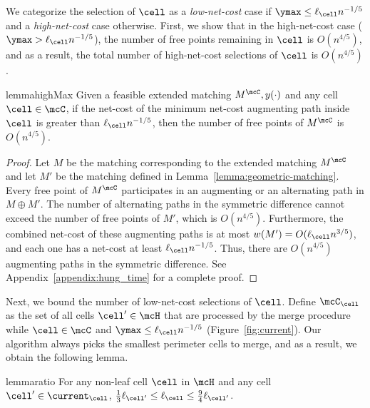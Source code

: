 We categorize the selection of $\cell$ as a \emph{low-net-cost} case if $\ymax\le \ell_\cell n^{-1/5}$ and a \emph{high-net-cost} case otherwise. First, we show that in the high-net-cost case ($\ymax>\ell_\cell n^{-1/5}$), the number of free points remaining in $\cell$ is $O(n^{4/5})$, and as a result, the total number of high-net-cost selections of $\cell$ is $O(n^{4/5})$.

\begin{restatable}{lemma}{highMax}\label{lemma:high-max}
    Given a feasible extended matching $M^\mcC, y(\cdot)$ and any cell $\cell\in\mcC$, if the net-cost of the minimum net-cost augmenting path inside $\cell$ is greater than $\ell_\cell n^{-1/5}$, then the number of free points of $M^\mcC$ is $O(n^{4/5})$.
\end{restatable}
\begin{proof}
    Let $M$ be the matching corresponding to the extended matching $M^\mcC$ and let $M'$ be the matching defined in Lemma~\ref{lemma:geometric-matching}. Every free point of $M^\mcC$ participates in an augmenting or an alternating path in $M\oplus M'$. The number of alternating paths in the symmetric difference cannot exceed the number of free points of $M'$, which is $O(n^{4/5})$. Furthermore, the combined net-cost of these augmenting paths is at most $w(M')=O(\ell_\cell n^{3/5})$, and each one has a net-cost at least $\ell_\cell n^{-1/5}$. Thus, there are $O(n^{4/5})$ augmenting paths in the symmetric difference. See Appendix~\ref{appendix:hung_time} for a complete proof.
\end{proof}

Next, we bound the number of low-net-cost selections of $\cell$. Define $\mcC_\cell$ as the set of all cells $\cell'\in\mcH$ that are processed by the merge procedure while $\cell\in\mcC$ and $\ymax\le \ell_\cell n^{-1/5}$ (Figure~\ref{fig:current}). Our algorithm always picks the smallest perimeter cells to merge, and as a result, we obtain the following lemma.
\begin{restatable}{lemma}{ratio}
\label{lemma:ratio}
For any non-leaf cell $\cell$ in $\mcH$ and any cell $\cell'\in\current_\cell$, $\frac{1}{3}\ell_{\cell'}\le \ell_\cell \le \frac{9}{4}\ell_{\cell'}$.
\end{restatable}


